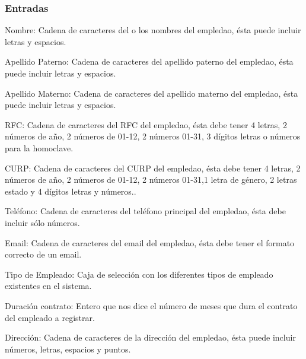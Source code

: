\subsubsection{Entradas}
	\begin{Citemize}
		\item Nombre: Cadena de caracteres del o los nombres del empledao, ésta puede incluir letras y espacios. 
		\item Apellido Paterno: Cadena de caracteres del apellido paterno del empledao, ésta puede incluir letras y espacios. 
		\item Apellido Materno: Cadena de caracteres del apellido materno del empledao, ésta puede incluir letras y espacios. 
		\item RFC: Cadena de caracteres del RFC del empledao, ésta debe tener 4 letras, 2 números de año, 2 números de 01-12, 2 números 01-31, 3 dígitos letras o números para la homoclave. 
		\item CURP: Cadena de caracteres del CURP del empledao, ésta debe tener 4 letras, 2 números de año, 2 números de 01-12, 2 números 01-31,1 letra de género, 2 letras estado y 4 dígitos letras y números.. 
		\item Teléfono: Cadena de caracteres del teléfono principal del empledao, ésta debe incluir sólo números. 
		\item Email: Cadena de caracteres del email del empledao, ésta debe tener el formato correcto de un email. 
		\item Tipo de Empleado: Caja de selección con los diferentes tipos de empleado existentes en el sistema.
		\item Duración contrato: Entero que nos dice el número de meses que dura el contrato del empleado a registrar.
		\item Dirección: Cadena de caracteres de la dirección del empledao, ésta puede incluir números, letras, espacios y puntos. 
	\end{Citemize}